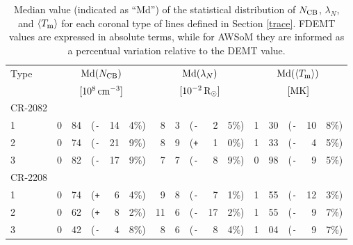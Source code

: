 \documentclass[namedreferences]{solarphysics}
\newcommand{\mrsun}{{\rm R_\odot}}
\newcommand{\med}{{\rm Md}}
\newcommand{\avgTe}{\left<\Tm\right>}
\newcommand{\MK}{{\rm MK}}
\newcommand{\lN}{\lambda_N}
\newcommand{\NCB}{N_{\rm CB}}
\newcommand{\aTm}{\left<\Tm\right>}
\newcommand{\Tm}{T_{\rm m}}
\newcommand{\Ne}{N_{\rm e}}
\newcommand{\Pl}{\texttt{+}}
\newcommand{\Mi}{\texttt{-}}
\begin{document}
\begin{article}
\begin{table}
\begin{tabular}{l r@{.}l@{\hskip 0.05in} r@{\hskip 0.01in} r@{.}l  r@{.}l@{\hskip 0.05in} r@{\hskip 0.01in} r@{.}l r@{.}l@{\hskip 0.05in} r@{\hskip 0.01in} r@{.}l }
\hline
Type    & \multicolumn{5}{c}{$\med(\NCB)$}             & \multicolumn{5}{c}{$\med(\lN)$} & \multicolumn{5}{c}{$\med(\avgTe)$} \\
       & \multicolumn{5}{c}{$[10^8\,{\rm cm}^{-3}]$}  & \multicolumn{5}{c}{$[{\rm 10}^{-2}\,\mrsun]$} & \multicolumn{5}{c}{$[\MK]$} \\
\hline
CR-2082\\
1  & 0&84 &(\Mi&14&4\%)  &   8&3 &(\Mi&~2&5\%) &   1&30 &(\Mi&10&8\%) \\
2  & 0&74 &(\Mi&21&9\%)  &   8&9 &(\Pl&~1&0\%) &   1&33 &(\Mi&~4&5\%) \\
3  & 0&82 &(\Mi&17&9\%)  &   7&7 &(\Mi&~8&9\%) &   0&98 &(\Mi&~9&5\%) \\
\hline          
CR-2208\\
1  & 0&74 &(\Pl&~6&4\%)  &   9&8 &(\Mi&~7&1\%) &   1&55 &(\Mi&12&3\%) \\
2  & 0&62 &(\Pl&~8&2\%)  &  11&6 &(\Mi&17&2\%) &   1&55 &(\Mi&~9&7\%) \\
3  & 0&42 &(\Mi&~4&8\%)  &   8&6 &(\Mi&~8&4\%) &   1&04 &(\Mi&~9&7\%) \\
\end{tabular}
\caption{Median value (indicated as ``Md'') of the statistical distribution of $\NCB$, $\lN$, and $\aTm$ for each coronal type of lines defined in Section \ref{trace}. FDEMT values are expressed in absolute terms, while for AWSoM they are informed as a percentual variation relative to the DEMT value.}
\label{tabla_comp}
\end{table}





\end{article}
\end{document}
